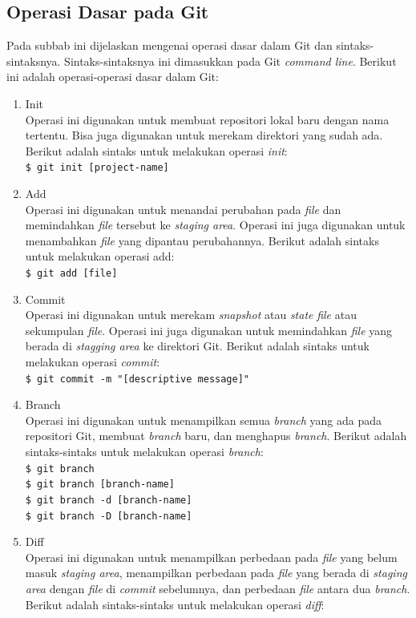 \subsection{Operasi Dasar pada Git}
\label{subsec:operasi_dasar_git}
Pada subbab ini dijelaskan mengenai operasi dasar dalam Git dan sintaks-sintaksnya. Sintaks-sintaksnya ini dimasukkan pada Git \textit{command line}. Berikut ini adalah operasi-operasi dasar dalam Git:
\begin{enumerate}
\item Init\\
Operasi ini digunakan untuk membuat repositori lokal baru dengan nama tertentu. Bisa juga digunakan untuk merekam direktori yang sudah ada. Berikut adalah sintaks untuk melakukan operasi  \textit{init}:\\
\texttt{\$ git init [project-name]}  
\item Add\\
Operasi ini digunakan untuk menandai perubahan pada \textit{file} dan memindahkan \textit{file} tersebut ke \textit{staging area}. Operasi ini juga digunakan untuk menambahkan \textit{file} yang dipantau perubahannya. Berikut adalah sintaks untuk melakukan operasi add:\\
\texttt{\$ git add [file]}  
\item Commit\\
Operasi ini digunakan untuk merekam \textit{snapshot} atau \textit{state} \textit{file} atau sekumpulan \textit{file}. Operasi ini juga digunakan untuk memindahkan \textit{file} yang berada di \textit{stagging area} ke direktori Git. Berikut adalah sintaks untuk melakukan operasi \textit{commit}:\\
\texttt{\$ git commit -m "[descriptive message]"}  
\item Branch\\
Operasi ini digunakan untuk menampilkan semua \textit{branch} yang ada pada repositori Git, membuat \textit{branch} baru, dan menghapus \textit{branch}. Berikut adalah sintaks-sintaks untuk melakukan operasi \textit{branch}:\\
\texttt{\$ git branch}\\ 
\texttt{\$ git branch [branch-name]}\\
\texttt{\$ git branch -d [branch-name]}\\
\texttt{\$ git branch -D [branch-name]} 
\item Diff\\
Operasi ini digunakan untuk menampilkan perbedaan pada \textit{file} yang belum masuk \textit{staging area}, menampilkan perbedaan pada \textit{file} yang berada di \textit{staging area} dengan \textit{file} di \textit{commit} sebelumnya, dan perbedaan \textit{file} antara dua \textit{branch}.  Berikut adalah sintaks-sintaks untuk melakukan operasi \textit{diff}:\\

\end{enumerate}
